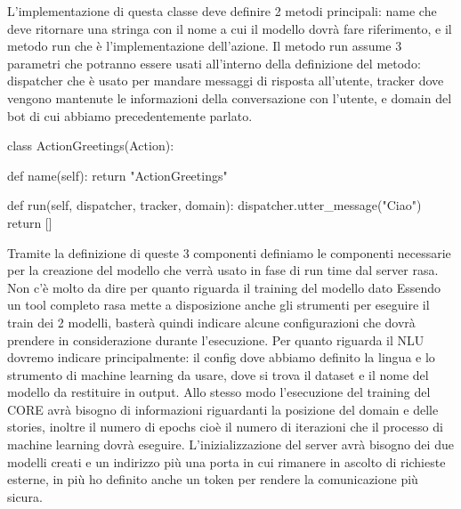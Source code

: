 L'implementazione di questa classe deve definire 2 metodi principali: name che deve ritornare una stringa con il nome a cui il modello dovrà fare riferimento, e il metodo run che è l'implementazione dell'azione.
Il metodo run assume 3 parametri che potranno essere usati all'interno della definizione del metodo: dispatcher che è usato per mandare messaggi di risposta all'utente, tracker dove vengono mantenute le informazioni della conversazione con l'utente, e domain del bot di cui abbiamo precedentemente parlato.
\begin{python}
class ActionGreetings(Action):

    def name(self):
        return "ActionGreetings"

    def run(self, dispatcher, tracker, domain):
        dispatcher.utter_message("Ciao")
        return []
\end{python}
Tramite la definizione di queste 3 componenti definiamo le componenti necessarie per la creazione del modello che verrà usato in fase di run time dal server rasa.
Non c'è molto da dire per quanto riguarda il training del modello dato
Essendo un tool completo rasa mette a disposizione anche gli strumenti per eseguire il train dei 2 modelli, basterà quindi indicare alcune configurazioni che dovrà prendere in considerazione durante l'esecuzione.
Per quanto riguarda il NLU dovremo indicare principalmente: il config dove abbiamo definito la lingua e lo strumento di machine learning da usare, dove si trova il dataset e il nome del modello da restituire in output.
Allo stesso modo l'esecuzione del training del CORE avrà bisogno di informazioni riguardanti la posizione del domain e delle stories, inoltre il numero di epochs cioè il numero di iterazioni che il processo di machine learning dovrà eseguire.
L'inizializzazione del server avrà bisogno dei due modelli creati e un indirizzo più una porta in cui rimanere in ascolto di richieste esterne, in più ho definito anche un token per rendere la comunicazione più sicura.

